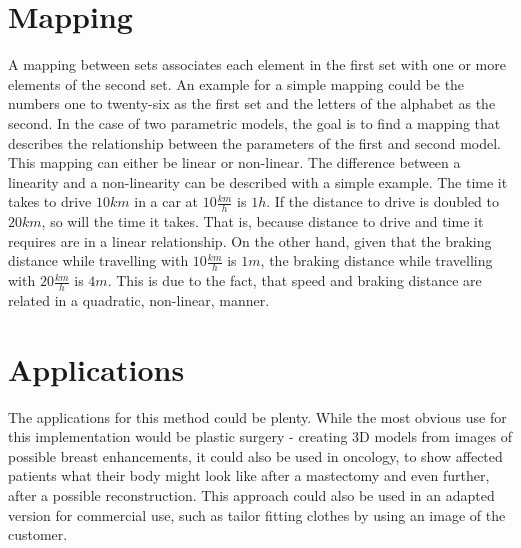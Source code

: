 \section{Mapping}
A mapping between sets associates each element in the first set with one or more elements of the second set. An example for a simple mapping could be the numbers one to twenty-six as the first set and the letters of the alphabet as the second. In the case of two parametric models, the goal is to find a mapping that describes the relationship between the parameters of the first and second model. \\
This mapping can either be linear or non-linear. The difference between a linearity and a non-linearity can be described with a simple example. The time it takes to drive $10km$ in a car at $10\frac{km}{h}$ is $1h$. If the distance to drive is doubled to $20km$, so will the time it takes. That is, because distance to drive and time it requires are in a linear relationship. On the other hand, given that the braking distance while travelling with $10\frac{km}{h}$ is $1m$, the braking distance while travelling with $20\frac{km}{h}$ is $4m$. This is due to the fact, that speed and braking distance are related in a quadratic, non-linear, manner.

\section{Applications}
The applications for this method could be plenty. While the most obvious use for this implementation would be plastic surgery - creating 3D models from images of possible breast enhancements, it could also be used in oncology, to show affected patients what their body might look like after a mastectomy and even further, after a possible reconstruction. This approach could also be used in an adapted version for commercial use, such as tailor fitting clothes by using an image of the customer.

